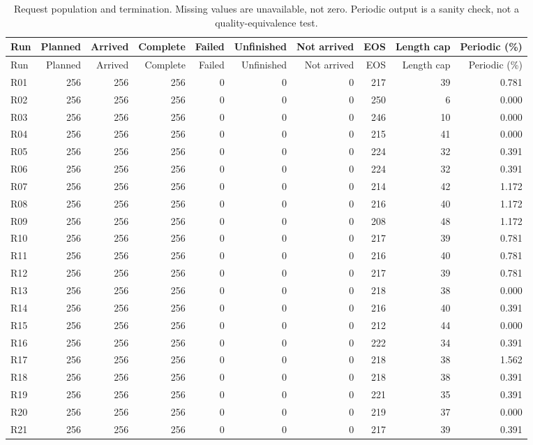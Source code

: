 \begin{longtable}{lrrrrrrrrr}
\caption{Request population and termination. Missing values are unavailable, not zero. Periodic output is a sanity check, not a quality-equivalence test.}\\
\toprule
Run & Planned & Arrived & Complete & Failed & Unfinished & Not arrived & EOS & Length cap & Periodic (\%)\\\midrule\endfirsthead
\toprule
Run & Planned & Arrived & Complete & Failed & Unfinished & Not arrived & EOS & Length cap & Periodic (\%)\\\midrule\endhead
\bottomrule\endfoot
R01 & 256 & 256 & 256 & 0 & 0 & 0 & 217 & 39 & 0.781\\
R02 & 256 & 256 & 256 & 0 & 0 & 0 & 250 & 6 & 0.000\\
R03 & 256 & 256 & 256 & 0 & 0 & 0 & 246 & 10 & 0.000\\
R04 & 256 & 256 & 256 & 0 & 0 & 0 & 215 & 41 & 0.000\\
R05 & 256 & 256 & 256 & 0 & 0 & 0 & 224 & 32 & 0.391\\
R06 & 256 & 256 & 256 & 0 & 0 & 0 & 224 & 32 & 0.391\\
R07 & 256 & 256 & 256 & 0 & 0 & 0 & 214 & 42 & 1.172\\
R08 & 256 & 256 & 256 & 0 & 0 & 0 & 216 & 40 & 1.172\\
R09 & 256 & 256 & 256 & 0 & 0 & 0 & 208 & 48 & 1.172\\
R10 & 256 & 256 & 256 & 0 & 0 & 0 & 217 & 39 & 0.781\\
R11 & 256 & 256 & 256 & 0 & 0 & 0 & 216 & 40 & 0.781\\
R12 & 256 & 256 & 256 & 0 & 0 & 0 & 217 & 39 & 0.781\\
R13 & 256 & 256 & 256 & 0 & 0 & 0 & 218 & 38 & 0.000\\
R14 & 256 & 256 & 256 & 0 & 0 & 0 & 216 & 40 & 0.391\\
R15 & 256 & 256 & 256 & 0 & 0 & 0 & 212 & 44 & 0.000\\
R16 & 256 & 256 & 256 & 0 & 0 & 0 & 222 & 34 & 0.391\\
R17 & 256 & 256 & 256 & 0 & 0 & 0 & 218 & 38 & 1.562\\
R18 & 256 & 256 & 256 & 0 & 0 & 0 & 218 & 38 & 0.391\\
R19 & 256 & 256 & 256 & 0 & 0 & 0 & 221 & 35 & 0.391\\
R20 & 256 & 256 & 256 & 0 & 0 & 0 & 219 & 37 & 0.000\\
R21 & 256 & 256 & 256 & 0 & 0 & 0 & 217 & 39 & 0.391\\

\end{longtable}
